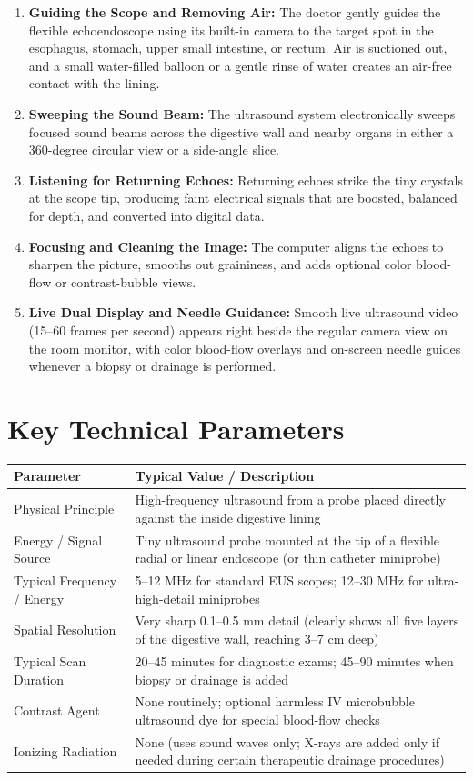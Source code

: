 \begin{enumerate}
    \item \textbf{Guiding the Scope and Removing Air:} The doctor gently guides the flexible echoendoscope using its built-in camera to the target spot in the esophagus, stomach, upper small intestine, or rectum. Air is suctioned out, and a small water-filled balloon or a gentle rinse of water creates an air-free contact with the lining.
    \item \textbf{Sweeping the Sound Beam:} The ultrasound system electronically sweeps focused sound beams across the digestive wall and nearby organs in either a 360-degree circular view or a side-angle slice.
    \item \textbf{Listening for Returning Echoes:} Returning echoes strike the tiny crystals at the scope tip, producing faint electrical signals that are boosted, balanced for depth, and converted into digital data.
    \item \textbf{Focusing and Cleaning the Image:} The computer aligns the echoes to sharpen the picture, smooths out graininess, and adds optional color blood-flow or contrast-bubble views.
    \item \textbf{Live Dual Display and Needle Guidance:} Smooth live ultrasound video (15--60 frames per second) appears right beside the regular camera view on the room monitor, with color blood-flow overlays and on-screen needle guides whenever a biopsy or drainage is performed.
\end{enumerate}

\section{Key Technical Parameters}

\noindent\begin{tabularx}{\textwidth}{@{}l X@{}}
\toprule
\textbf{Parameter} & \textbf{Typical Value / Description} \\
\midrule
Physical Principle & High-frequency ultrasound from a probe placed directly against the inside digestive lining \\
Energy / Signal Source & Tiny ultrasound probe mounted at the tip of a flexible radial or linear endoscope (or thin catheter miniprobe) \\
Typical Frequency / Energy & 5--12 MHz for standard EUS scopes; 12--30 MHz for ultra-high-detail miniprobes \\
Spatial Resolution & Very sharp 0.1--0.5 mm detail (clearly shows all five layers of the digestive wall, reaching 3--7 cm deep) \\
Typical Scan Duration & 20--45 minutes for diagnostic exams; 45--90 minutes when biopsy or drainage is added \\
Contrast Agent & None routinely; optional harmless IV microbubble ultrasound dye for special blood-flow checks \\
Ionizing Radiation & None (uses sound waves only; X-rays are added only if needed during certain therapeutic drainage procedures) \\
\bottomrule
\end{tabularx}

